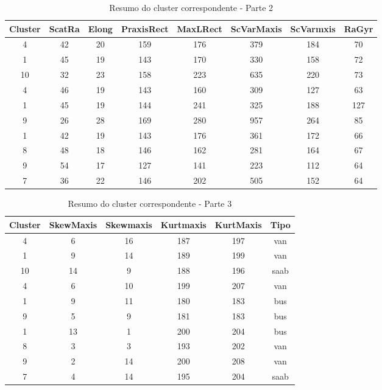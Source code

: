 \begin{table}[H]
\centering
\caption{Resumo do cluster correspondente - Parte 2}
\begin{tabular}{|c|c|c|c|c|c|c|c|}
\hline
Cluster & ScatRa & Elong & PraxisRect & MaxLRect & ScVarMaxis & ScVarmxis & RaGyr \\ \hline
4  & 42 & 20 & 159 & 176 & 379 & 184 & 70 \\ \hline
1  & 45 & 19 & 143 & 170 & 330 & 158 & 72 \\ \hline
10 & 32 & 23 & 158 & 223 & 635 & 220 & 73 \\ \hline
4  & 46 & 19 & 143 & 160 & 309 & 127 & 63 \\ \hline
1  & 45 & 19 & 144 & 241 & 325 & 188 & 127 \\ \hline
9  & 26 & 28 & 169 & 280 & 957 & 264 & 85 \\ \hline
1  & 42 & 19 & 143 & 176 & 361 & 172 & 66 \\ \hline
8  & 48 & 18 & 146 & 162 & 281 & 164 & 67 \\ \hline
9  & 54 & 17 & 127 & 141 & 223 & 112 & 64 \\ \hline
7  & 36 & 22 & 146 & 202 & 505 & 152 & 64 \\ \hline
\end{tabular}
\end{table}

\begin{table}[H]
\centering
\caption{Resumo do cluster correspondente - Parte 3}
\begin{tabular}{|c|c|c|c|c|c|}
\hline
Cluster & SkewMaxis & Skewmaxis & Kurtmaxis & KurtMaxis & Tipo \\ \hline
4  & 6  & 16 & 187 & 197 & van  \\ \hline
1  & 9  & 14 & 189 & 199 & van  \\ \hline
10 & 14 & 9  & 188 & 196 & saab \\ \hline
4  & 6  & 10 & 199 & 207 & van  \\ \hline
1  & 9  & 11 & 180 & 183 & bus  \\ \hline
9  & 5  & 9  & 181 & 183 & bus  \\ \hline
1  & 13 & 1  & 200 & 204 & bus  \\ \hline
8  & 3  & 3  & 193 & 202 & van  \\ \hline
9  & 2  & 14 & 200 & 208 & van  \\ \hline
7  & 4  & 14 & 195 & 204 & saab \\ \hline
\end{tabular}
\end{table}



